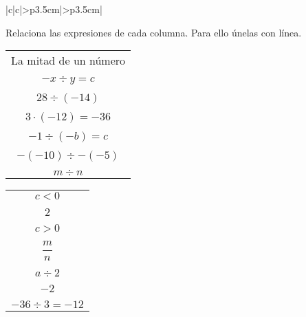\documentclass[spanish,letterpaper, 11pt, addpoints, answers]{exam}
\begin{document}
\begin{questions}
\begin{itemize}
\begin{center}
\begin{tabular}{|c|c|>{\centering\arraybackslash}p{3.5cm}|>{\centering\arraybackslash}p{3.5cm}|}
    
  \end{tabular}
\end{center}
\end{itemize}

\question Relaciona las expresiones de cada columna. Para ello únelas con línea.


\begin{minipage}{0.4\linewidth}
  \begin{tcolorbox}[colback=white]
  \begin{center}
    \begin{tabular}{c}
      La mitad de un número\\\\
      $-x\div y=c$\\\\
      $28\div (-14)$\\\\
      $3\cdot (-12)=-36$\\\\
      $-1\div (-b)=c$\\\\
      $-(-10)\div -(-5)$\\\\
      $m\div n$
      
    \end{tabular}
  \end{center}
\end{tcolorbox}
\end{minipage}
\hfill
\begin{minipage}{0.4\linewidth}
  \begin{tcolorbox}[colback=white]
  \begin{center}
    \begin{tabular}{c}
      $c<0$\\\\
      $2$\\\\
      $c>0$\\\\
      $\dfrac{m}{n}$\\\\
      $a\div 2$\\\\
      $-2$\\\\
      $-36\div 3=-12$
      
    \end{tabular}
  \end{center}
\end{tcolorbox}
\end{minipage}




\end{questions}
\end{document}
